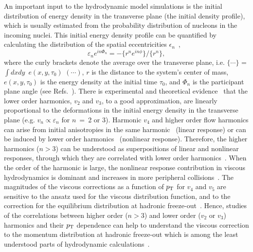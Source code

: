 An important input to the hydrodynamic model simulations is the initial distribution of energy density in the transverse plane (the initial density profile), which is usually estimated from the probability distribution of nucleons in the incoming nuclei.
This initial energy density profile can be quantified by calculating the distribution of the spatial eccentricities $\epsilon_n$~\cite{Alver:2010gr},
\begin{equation}
 \varepsilon_{n} e^{in\Phi_{n}} = -\{r^n e^{in\phi}\}/ \{r^n\},
  \label{eq:eccentricities}
\end{equation}
where the curly brackets denote the average over the transverse plane, i.e. $\{\cdots\}$ = $\int dxdy$\, $e(x,y,\tau_0)$ $(\cdots)$, $r$ is the distance to the system's center of mass, $e(x,y,\tau_0)$ is the energy density at the initial time $\tau_0$, and $\Phi_{n}$ is the participant plane angle (see Refs.~\cite{Teaney:2010vd,Niemi:2015qia}).
There is experimental and theoretical evidence~\cite{Alver:2010gr,Qiu:2011iv,ALICE:2011ab} that the lower order harmonics, $v_2$ and $v_3$, to a good approximation, are linearly proportional to the deformations in the initial energy density in the transverse plane (e.g. $v_n \propto \varepsilon_n$ for $n~=~$2 or 3).
Harmonic $v_4$ and higher order flow harmonics can arise from initial anisotropies in the same harmonic~\cite{Alver:2010gr,Teaney:2010vd,Gubser:2010ui,Hatta:2014jva} (linear response) or can be induced by lower order harmonics~\cite{Bravina:2013xla,Bravina:2013ora} (nonlinear response).
Therefore, the higher harmonics ($n>3$) can be understood as superpositions of linear and nonlinear responses, through which they are correlated with lower order harmonics~\cite{Teaney:2012ke,Bravina:2013ora,Gubser:2010ui,Hatta:2014jva}. When the order of the harmonic is large, the nonlinear response contribution in viscous hydrodynamics is dominant and increases in more peripheral collisions~\cite{Teaney:2012ke,Bravina:2013ora}.
The magnitudes of the viscous corrections as a function of $p_{\rm T}$ for $v_4$ and $v_5$ are sensitive to the ansatz used for the viscous distribution function, and to the correction for the equilibrium distribution at hadronic freeze-out~\cite{Luzum:2010ad,Teaney:2012ke}.
Hence, studies of the correlations between higher order ($n>3$) and lower order ($v_2$ or $v_3$) harmonics and their $p_{\rm T}$ dependence can help to understand the viscous correction to the momentum distribution at hadronic freeze-out which is among the least understood parts of hydrodynamic calculations~\cite{Dusling:2009df,Teaney:2012ke,Molnar:2014fva,Niemi:2015qia}.

